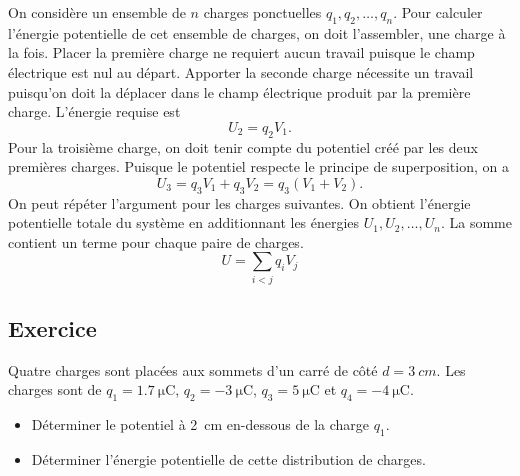 On considère un ensemble de $n$ charges ponctuelles $q_1, q_2, \ldots, q_n$.
Pour calculer l'énergie potentielle de cet ensemble de charges, on doit
l'assembler, une charge à la fois. Placer la première charge ne requiert aucun
travail puisque le champ électrique est nul au départ. Apporter la seconde
charge nécessite un travail puisqu'on doit la déplacer dans le champ électrique
produit par la première charge. L'énergie requise est
\[
  U_2 = q_2 V_1.
\]
Pour la troisième charge, on doit tenir compte du potentiel créé par les deux
premières charges. Puisque le potentiel respecte le principe de superposition,
on a
\[
  U_3 = q_3 V_1 + q_3 V_2 = q_3 (V_1 + V_2).
\]
On peut répéter l'argument pour les charges suivantes. On obtient l'énergie
potentielle totale du système en additionnant les énergies $U_1, U_2, \ldots,
U_n$.  La somme contient un terme pour chaque paire de charges.
\[
  U = \sum_{i < j} q_i V_j
\]



\sectionline



\subsection*{Exercice}

Quatre charges sont placées aux sommets d'un carré de côté $d = \SI{3}{cm}$. Les
charges sont de $q_1 = \SI{1.7}{\micro\coulomb}$, $q_2 = \SI{-3}{\micro\coulomb}$,
$q_3 = \SI{5}{\micro\coulomb}$ et $q_4 = \SI{-4}{\micro\coulomb}$.


\begin{itemize}
  \item Déterminer le potentiel à \SI{2}{cm} en-dessous de la charge $q_1$.
  \item Déterminer l'énergie potentielle de cette distribution de charges.
\end{itemize}

\begin{center}
\end{center}

